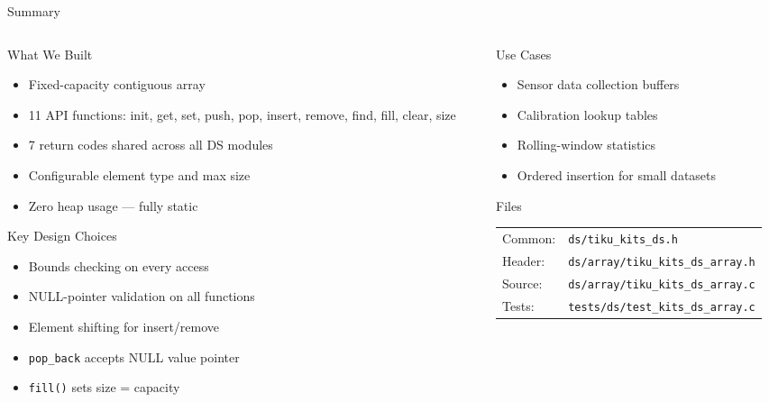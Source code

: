 \documentclass[aspectratio=169, 10pt]{beamer}
\begin{document}
\begin{frame}{Summary}
\begin{columns}[T]
\begin{column}{0.48\textwidth}
\begin{block}{What We Built}
\begin{itemize}
  \item Fixed-capacity contiguous array
  \item 11 API functions: init, get, set, push, pop, insert, remove, find, fill, clear, size
  \item 7 return codes shared across all DS modules
  \item Configurable element type and max size
  \item Zero heap usage --- fully static
\end{itemize}
\end{block}

\begin{block}{Key Design Choices}
\begin{itemize}
  \item Bounds checking on every access
  \item NULL-pointer validation on all functions
  \item Element shifting for insert/remove
  \item \texttt{pop\_back} accepts NULL value pointer
  \item \texttt{fill()} sets size = capacity
\end{itemize}
\end{block}
\end{column}

\begin{column}{0.48\textwidth}
\begin{block}{Use Cases}
\begin{itemize}
  \item Sensor data collection buffers
  \item Calibration lookup tables
  \item Rolling-window statistics
  \item Ordered insertion for small datasets
\end{itemize}
\end{block}

\begin{block}{Files}
\scriptsize
\begin{tabular}{@{}lp{4.5cm}@{}}
Common: & \texttt{ds/tiku\_kits\_ds.h} \\
Header: & \texttt{ds/array/tiku\_kits\_ds\_array.h} \\
Source: & \texttt{ds/array/tiku\_kits\_ds\_array.c} \\
Tests:  & \texttt{tests/ds/test\_kits\_ds\_array.c} \\
\end{tabular}
\end{block}
\end{column}
\end{columns}
\end{frame}
\end{document}
